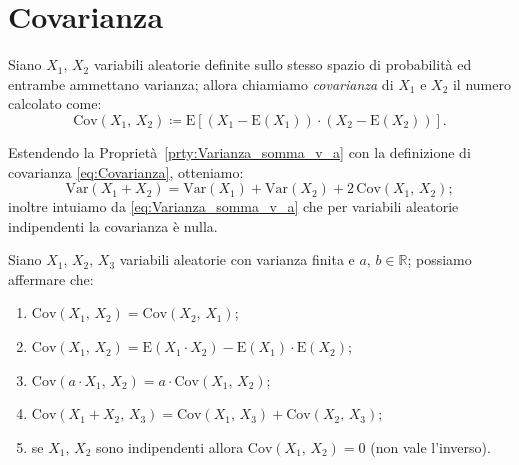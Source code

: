     \section{Covarianza}
        \begin{defn}
            Siano $X_1,\,X_2$ variabili aleatorie definite sullo stesso spazio di probabilità ed entrambe ammettano varianza; allora chiamiamo \emph{covarianza} di $X_1$ e $X_2$ il numero calcolato come:
            \begin{equation}\label{eq:Covarianza}
                \text{Cov}(X_1,\,X_2) \coloneqq \text{E}\left[(X_1-\text{E}(X_1))\cdot(X_2-\text{E}(X_2))\right]
            .\end{equation}
        \end{defn}
        \begin{obsv}
            Estendendo la Proprietà~\ref{prty:Varianza_somma_v_a} con la definizione di covarianza \eqref{eq:Covarianza}, otteniamo: \[
            \text{Var}(X_1+X_2) = \text{Var}(X_1) + \text{Var}(X_2) + 2\,\text{Cov}(X_1,\,X_2)
        ;\] inoltre intuiamo da \eqref{eq:Varianza_somma_v_a} che per variabili aleatorie indipendenti la covarianza è nulla.
        \end{obsv}
        \begin{prty}
            Siano $X_1,\,X_2,\,X_3$ variabili aleatorie con varianza finita e $a,\,b \in \mathbb{R}$; possiamo affermare che:
            \begin{enumerate}
                \item $\text{Cov}(X_1,\,X_2) = \text{Cov}(X_2,\,X_1)$;
                \item $\text{Cov}(X_1,\,X_2) = \text{E}(X_1\cdot X_2) - \text{E}(X_1)\cdot \text{E}(X_2)$;
                \item $\text{Cov}(a\cdot X_1,\,X_2) = a\cdot \text{Cov}(X_1,\,X_2)$;
                \item $\text{Cov}(X_1+X_2,\,X_3) = \text{Cov}(X_1,\,X_3)+\text{Cov}(X_2,\,X_3)$;
                \item se $X_1,\,X_2$ sono indipendenti allora $\text{Cov}(X_1,\,X_2)=0$ (non vale l'inverso).
            \end{enumerate}
        \end{prty}
